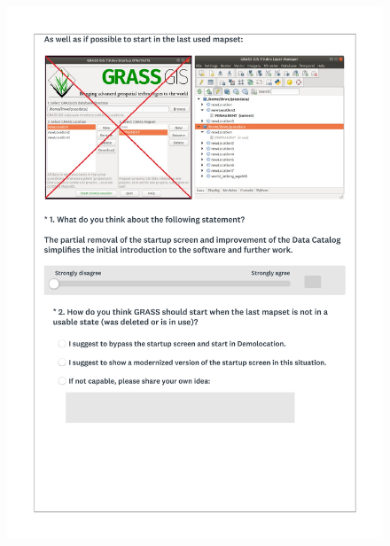 \documentclass[a4paper,10pt,twoside]{article}
\begin{document}
 \newpage
 \begin{figure}[hbt!]
 \begin{center}
 \includegraphics[width=16cm]{../surveys/questionnaires/survey1_part1_page3_questions1_2.pdf}
 \end{center}
 \end{figure}
 
\end{document}
